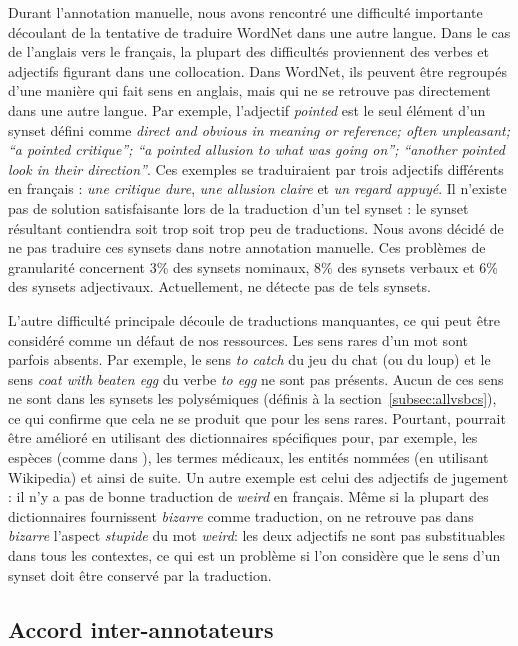 Durant l'annotation manuelle, nous avons rencontré une difficulté importante découlant de la tentative de traduire WordNet dans une autre langue. Dans le cas de l'anglais vers le français, la plupart des difficultés proviennent des verbes et adjectifs figurant dans une collocation. Dans WordNet, ils peuvent être regroupés d'une manière qui fait sens en anglais, mais qui ne se retrouve pas directement dans une autre langue. Par exemple, l'adjectif \textit{pointed} est le seul élément d'un synset défini comme \textit{direct and obvious in meaning or reference; often unpleasant; ``a pointed critique''; ``a pointed allusion to what was going on''; ``another pointed look in their direction''}. Ces exemples se traduiraient par trois adjectifs différents en français : \textit{une critique dure}, \textit{une allusion claire} et \textit{un regard appuyé}. Il n'existe pas de solution satisfaisante lors de la traduction d'un tel synset : le synset résultant contiendra soit trop soit trop peu de traductions. Nous avons décidé de ne pas traduire ces synsets dans notre annotation manuelle. Ces problèmes de granularité concernent 3\% des synsets nominaux, 8\% des synsets verbaux et 6\% des synsets adjectivaux. Actuellement, \newjaws{} ne détecte pas de tels synsets. 

L'autre difficulté principale découle de traductions manquantes, ce qui peut être considéré comme un défaut de nos ressources. Les sens rares d'un mot sont parfois absents. Par exemple, le sens \textit{to catch} du jeu du chat (ou du loup) et le sens \textit{coat with beaten egg} du verbe \textit{to egg} ne sont pas présents. Aucun de ces sens ne sont dans les synsets les polysémiques (définis à la section~\ref{subsec:allvsbcs}), ce qui confirme que cela ne se produit que pour les sens rares. Pourtant, \newjaws{} pourrait être amélioré en utilisant des dictionnaires spécifiques pour, par exemple, les espèces (comme dans \cite{SagotFiser2008}), les termes médicaux, les entités nommées (en utilisant Wikipedia) et ainsi de suite. Un autre exemple est celui des adjectifs de jugement : il n'y a pas de bonne traduction de \textit{weird} en français. Même si la plupart des dictionnaires fournissent \textit{bizarre} comme traduction, on ne retrouve pas dans \textit{bizarre} l'aspect \textit{stupide} du mot \textit{weird}: les deux adjectifs ne sont pas substituables dans tous les contextes, ce qui est un problème si l'on considère que le sens d'un synset doit être conservé par la traduction.

\subsection{Accord inter-annotateurs}
\label{subsec:interannotator_agreement}

